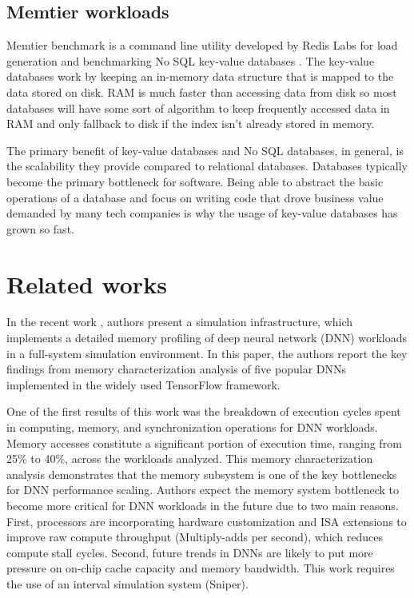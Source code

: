 \documentclass[]{PhDEngScITESO-R}
\begin{document}
\subsection{Memtier workloads}

Memtier benchmark is a command line utility developed by Redis Labs for load generation and benchmarking No SQL key-value databases \cite{Alami}. The key-value databases work by keeping an in-memory data structure that is mapped to the data stored on disk. RAM is much faster than accessing data from disk so most databases will have some sort of algorithm to keep frequently accessed data in RAM and only fallback to disk if the index isn't already stored in memory.

The primary benefit of key-value databases and No SQL databases, in general, is the scalability they provide compared to relational databases. Databases typically become the primary bottleneck for software. Being able to abstract the basic operations of a database and focus on writing code that drove business value demanded by many tech companies is why the usage of key-value databases has grown so fast.

\section{Related works}

In the recent work \cite{Chishti}, authors present a  simulation infrastructure,  which implements a detailed memory profiling of deep neural network (DNN) workloads in a full-system simulation environment.  In this paper,  the authors report the key findings from memory characterization analysis of five popular DNNs implemented in the widely used  TensorFlow framework. 

One of the first results of this work was the breakdown of execution cycles spent in computing, memory, and synchronization operations for DNN workloads. Memory accesses constitute a significant portion of execution time, ranging from 25\% to 40\%, across the workloads analyzed. This memory characterization analysis demonstrates that the memory subsystem is one of the key bottlenecks for DNN performance scaling. Authors expect the memory system bottleneck to become more critical for DNN workloads in the future due to two main reasons. First, processors are incorporating hardware customization and  ISA  extensions to improve raw compute throughput (Multiply-adds per second), which reduces compute stall cycles. Second, future trends in DNNs are likely to put more pressure on on-chip cache capacity and memory bandwidth. This work requires the use of an interval simulation system (Sniper).
\end{document}

